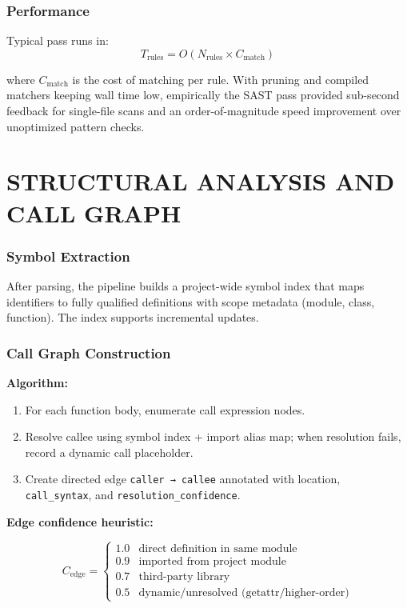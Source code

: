 \subsubsection{Performance}

Typical pass runs in:
\begin{equation}
T_{\text{rules}} = O(N_{\text{rules}} \times C_{\text{match}})
\label{eq:rule_complexity}
\end{equation}

where $C_{\text{match}}$ is the cost of matching per rule. With pruning and compiled matchers keeping wall time low, empirically the SAST pass provided sub-second feedback for single-file scans and an order-of-magnitude speed improvement over unoptimized pattern checks.

\section{\uppercase{Structural Analysis and Call Graph}}

\subsubsection{Symbol Extraction}

After parsing, the pipeline builds a project-wide symbol index that maps identifiers to fully qualified definitions with scope metadata (module, class, function). The index supports incremental updates.

\subsubsection{Call Graph Construction}

\textbf{Algorithm:}

\begin{enumerate}
    \item For each function body, enumerate call expression nodes.
    \item Resolve callee using symbol index + import alias map; when resolution fails, record a dynamic call placeholder.
    \item Create directed edge \texttt{caller → callee} annotated with location, \texttt{call\_syntax}, and \texttt{resolution\_confidence}.
\end{enumerate}

\textbf{Edge confidence heuristic:}

\begin{equation}
C_{\text{edge}} = \begin{cases}
1.0 & \text{direct definition in same module} \\
0.9 & \text{imported from project module} \\
0.7 & \text{third-party library} \\
0.5 & \text{dynamic/unresolved (getattr/higher-order)}
\end{cases}
\label{eq:edge_confidence}
\end{equation}


